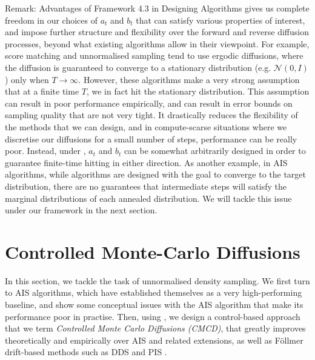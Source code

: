 \begin{lightgraybox}{Remark: Advantages of Framework 4.3 in Designing Algorithms}
     gives us complete freedom in our choices of $a_t$ and $b_t$ that can satisfy various properties of interest, and impose further structure and flexibility over the forward and reverse diffusion processes, beyond what existing algorithms allow in their viewpoint. For example, score matching and unnormalised sampling tend to use ergodic diffusions, where the diffusion is guaranteed to converge to a stationary distribution (e.g. $\mathcal{N}(0, I)$) only when $T \to \infty$. However, these algorithms make a very strong assumption that at a finite time $T$, we in fact hit the stationary distribution. This assumption can result in poor performance empirically, and can result in error bounds on sampling quality that are not very tight. It drastically reduces the flexibility of the methods that we can design, and in compute-scarse situations where we discretise our diffusions for a small number of steps, performance can be really poor. Instead, under , $a_t$ and $b_t$ can be somewhat arbitrarily designed in order to guarantee finite-time hitting in either direction. As another example, in AIS algorithms, while algorithms are designed with the goal to converge to the target distribution, there are no guarantees that intermediate steps will satisfy the marginal distributions of each annealed distribution. We will tackle this issue under our framework in the next section.
\end{lightgraybox}

\section{Controlled Monte-Carlo Diffusions}
\label{sec:controlled_monte_carlo_diffusions}

In this section, we tackle the task of unnormalised density sampling. We first turn to AIS algorithms, which have established themselves as a very high-performing baseline, and show some conceptual issues with the AIS algorithm that make its performance poor in practise. Then, using , we design a control-based approach that we term \textit{Controlled Monte Carlo Diffusions (CMCD)}, that greatly improves theoretically and empirically over AIS and related extensions, as well as F\"ollmer drift-based methods such as DDS \parencite{vargas2023denoising} and PIS \parencite{zhang2021path}.

